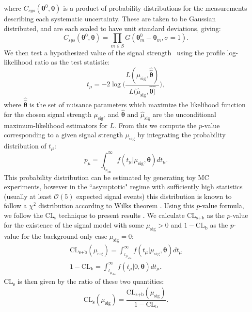where $C_{sys}(\boldsymbol{\theta}^0,\boldsymbol{\theta})$ is a product of probability distributions for the measurements describing each systematic uncertainty. These are taken to be Gaussian distributed, and are each scaled to have unit standard deviations, giving:
\begin{equation}
C_{sys}(\boldsymbol{\theta}^0,\boldsymbol{\theta}) = \prod_{m\in S} G(\boldsymbol{\theta}^{0}_{m} - \boldsymbol{\theta}_m, \sigma = 1).
\end{equation}
We then test a hypothesized value of the signal strength \mu~using the profile log-likelihood ratio as the test statistic:
\begin{equation}
\label{eq:prof_likelihood_ratio}
t_{\mu} = -2\log\Bigg( \frac{L(\mu_\text{sig}, \hat{\hat{\boldsymbol{\theta}}})}{L(\hat{\mu}_\text{sig}, \hat{\boldsymbol{\theta})}} \Bigg),
\end{equation}
where $\hat{\hat{\boldsymbol{\theta}}}$ is the set of nuisance parameters which maximize the likelihood function for the chosen signal strength $\mu_{\text{sig}}$, and $\hat{\boldsymbol{\theta}}$ and $\hat{\mu}_{\text{sig}}$ are the unconditional maximum-likelihood estimators for $L$. From this we compute the $p$-value corresponding to a given signal strength $\mu_{\text{sig}}$ by integrating the probability distribution of $t_{\mu}$:
\begin{equation}
p_{\mu} = \int_{t_{\mu_\text{obs}}}^\infty f(t_{\mu}|\mu_\text{sig}, \boldsymbol{\theta})dt_{\mu}.
\end{equation}
This probability distribution can be estimated by generating toy MC experiments, however in the ``asymptotic" regime with sufficiently high statistics (usually at least $\mathcal{O}(5)$ expected signal events) this distribution is known to follow a $\chi^2$ distribution according to Wilks theorem \cite{Wilks}.
Using this $p$-value formula, we follow the $\text{CL}_\text{s}$ technique to present results \cite{CLs}. We calculate $\text{CL}_\text{s+b}$ as the $p$-value for the existence of the signal model with some $\mu_{\text{sig}} > 0$ and $1 - \text{CL}_\text{b}$ as the $p$-value for the background-only case $\mu_{\text{sig}} = 0$:
\begin{equation}
\begin{gathered}
\text{CL}_\text{s+b}(\mu_\text{sig}) = \int_{t_{\mu_\text{obs}}}^\infty f(t_{\mu}|\mu_\text{sig}, \boldsymbol{\theta})dt_{\mu} \\
1 - \text{CL}_\text{b} = \int_{t_{\mu_\text{obs}}}^\infty f(t_{\mu}|0, \boldsymbol{\theta})dt_{\mu}.
\end{gathered}
\end{equation}
$\text{CL}_\text{s}$ is then given by the ratio of these two quantities:
\begin{equation}
\text{CL}_\text{s}(\mu_\text{sig}) = \frac{\text{CL}_\text{s+b}(\mu_\text{sig})}{1 - \text{CL}_\text{b}}.
\end{equation}

